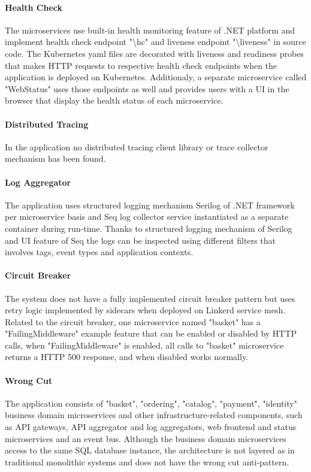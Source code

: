 \documentclass{Configuration_Files/PoliMi3i_thesis}
\begin{document}
\paragraph{Health Check} The microservices use built-in health monitoring feature of .NET platform and implement health check endpoint "\textbackslash hc" and liveness endpoint "\textbackslash liveness" in source code.
The Kubernetes yaml files are decorated with liveness and readiness probes that makes HTTP requests to respective health check endpoints when the application is deployed on Kubernetes.
Additionaly, a separate microservice called "WebStatus" uses those endpoints as well and provides users with a UI in the browser that display the health status of each microservice.

\paragraph{Distributed Tracing} In the application no distributed tracing client library or trace collector mechanism has been found.

\paragraph{Log Aggregator} The application uses structured logging mechanism Serilog\footnotemark[69] of .NET framework per microservice basis and Seq\footnotemark[70] log collector service instantiated as a separate container during run-time.
Thanks to structured logging mechanism of Serilog and UI feature of Seq the logs can be inspected using different filters that involves tags, event types and application contexts.

\paragraph{Circuit Breaker} The system does not have a fully implemented circuit breaker pattern but uses retry logic implemented by sidecars when deployed on Linkerd service mesh.
Related to the circuit breaker, one microservice named "basket" has a "FailingMiddleware" example feature that can be enabled or disabled by HTTP calls, when "FailingMiddleware" is enabled, all calls to "basket" microservice returns a HTTP 500 response, and when disabled works normally.

\paragraph{Wrong Cut} The application consists of "basket", "ordering", "catalog", "payment", "identity" business domain microservices and other infrastructure-related components, such as API gateways, API aggregator and log aggregators, web frontend and status microservices and an event bus.
Although the business domain microservices access to the same SQL database instance, the architecture is not layered as in traditional monolithic systems and does not have the wrong cut anti-pattern.
\end{document}
